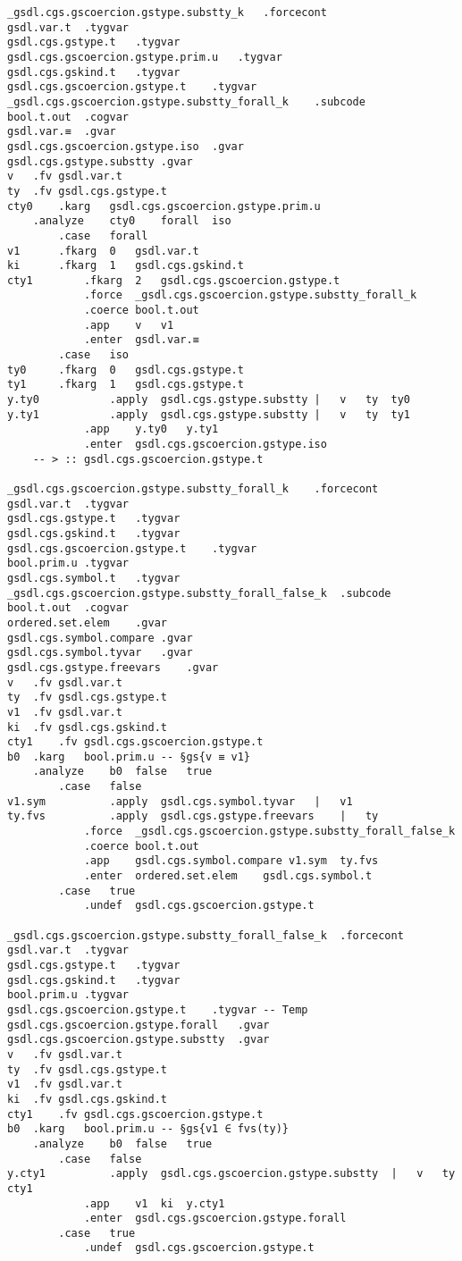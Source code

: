 \documentclass{report}
\begin{document}
\begin{verbatim}
_gsdl.cgs.gscoercion.gstype.substty_k	.forcecont
gsdl.var.t	.tygvar
gsdl.cgs.gstype.t	.tygvar
gsdl.cgs.gscoercion.gstype.prim.u	.tygvar
gsdl.cgs.gskind.t	.tygvar
gsdl.cgs.gscoercion.gstype.t	.tygvar
_gsdl.cgs.gscoercion.gstype.substty_forall_k	.subcode
bool.t.out	.cogvar
gsdl.var.≡	.gvar
gsdl.cgs.gscoercion.gstype.iso	.gvar
gsdl.cgs.gstype.substty	.gvar
v	.fv	gsdl.var.t
ty	.fv	gsdl.cgs.gstype.t
cty0	.karg	gsdl.cgs.gscoercion.gstype.prim.u
	.analyze	cty0	forall	iso
		.case	forall
v1		.fkarg	0	gsdl.var.t
ki		.fkarg	1	gsdl.cgs.gskind.t
cty1		.fkarg	2	gsdl.cgs.gscoercion.gstype.t
			.force	_gsdl.cgs.gscoercion.gstype.substty_forall_k
			.coerce	bool.t.out
			.app	v	v1
			.enter	gsdl.var.≡
		.case	iso
ty0		.fkarg	0	gsdl.cgs.gstype.t
ty1		.fkarg	1	gsdl.cgs.gstype.t
y.ty0			.apply	gsdl.cgs.gstype.substty	|	v	ty	ty0
y.ty1			.apply	gsdl.cgs.gstype.substty	|	v	ty	ty1
			.app	y.ty0	y.ty1
			.enter	gsdl.cgs.gscoercion.gstype.iso
	-- > :: gsdl.cgs.gscoercion.gstype.t

_gsdl.cgs.gscoercion.gstype.substty_forall_k	.forcecont
gsdl.var.t	.tygvar
gsdl.cgs.gstype.t	.tygvar
gsdl.cgs.gskind.t	.tygvar
gsdl.cgs.gscoercion.gstype.t	.tygvar
bool.prim.u	.tygvar
gsdl.cgs.symbol.t	.tygvar
_gsdl.cgs.gscoercion.gstype.substty_forall_false_k	.subcode
bool.t.out	.cogvar
ordered.set.elem	.gvar
gsdl.cgs.symbol.compare	.gvar
gsdl.cgs.symbol.tyvar	.gvar
gsdl.cgs.gstype.freevars	.gvar
v	.fv	gsdl.var.t
ty	.fv	gsdl.cgs.gstype.t
v1	.fv	gsdl.var.t
ki	.fv	gsdl.cgs.gskind.t
cty1	.fv	gsdl.cgs.gscoercion.gstype.t
b0	.karg	bool.prim.u	-- §gs{v ≡ v1}
	.analyze	b0	false	true
		.case	false
v1.sym			.apply	gsdl.cgs.symbol.tyvar	|	v1
ty.fvs			.apply	gsdl.cgs.gstype.freevars	|	ty
			.force	_gsdl.cgs.gscoercion.gstype.substty_forall_false_k
			.coerce	bool.t.out
			.app	gsdl.cgs.symbol.compare	v1.sym	ty.fvs
			.enter	ordered.set.elem	gsdl.cgs.symbol.t
		.case	true
			.undef	gsdl.cgs.gscoercion.gstype.t

_gsdl.cgs.gscoercion.gstype.substty_forall_false_k	.forcecont
gsdl.var.t	.tygvar
gsdl.cgs.gstype.t	.tygvar
gsdl.cgs.gskind.t	.tygvar
bool.prim.u	.tygvar
gsdl.cgs.gscoercion.gstype.t	.tygvar	-- Temp
gsdl.cgs.gscoercion.gstype.forall	.gvar
gsdl.cgs.gscoercion.gstype.substty	.gvar
v	.fv	gsdl.var.t
ty	.fv	gsdl.cgs.gstype.t
v1	.fv	gsdl.var.t
ki	.fv	gsdl.cgs.gskind.t
cty1	.fv	gsdl.cgs.gscoercion.gstype.t
b0	.karg	bool.prim.u	-- §gs{v1 ∈ fvs(ty)}
	.analyze	b0	false	true
		.case	false
y.cty1			.apply	gsdl.cgs.gscoercion.gstype.substty	|	v	ty	cty1
			.app	v1	ki	y.cty1
			.enter	gsdl.cgs.gscoercion.gstype.forall
		.case	true
			.undef	gsdl.cgs.gscoercion.gstype.t


\end{verbatim}
\end{document}
